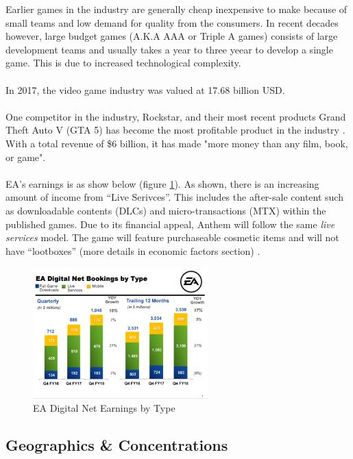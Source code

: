 \documentclass[10pt,letterpaper]{article}
\begin{document}
Earlier games in the industry are generally cheap inexpensive to make because of small teams and low demand for quality from the consumers. In recent decades however, large budget games (A.K.A AAA or Triple A games) consists of large development teams and usually takes  a year to three yeear to develop a single game. This is due to increased technological complexity.\cite{cost-game}\\
\\
In 2017, the video game industry was valued at 17.68 billion USD\cite{video-game-industry-stats}.\\
\\
One competitor in the industry, Rockstar, and their most recent products Grand Theft Auto V (GTA 5) has become the most profitable product in the industry \cite{ign-gta5}. With a total revenue of \$6 billion, it has made "more money than any film, book, or game".\\
\\
EA's earnings is as show below (figure \ref{fig:ea-revenue}). As shown, there is an increasing amount of income from ``Live Serivces''. This includes the after-sale content such as downloadable contents (DLCs) and micro-transactions (MTX) within the published games. Due to its financial appeal, Anthem will follow the same \textit{live services} model. The game will feature purchaseable cosmetic items  and will not have ``lootboxes'' (more details in economic factors section) \cite{ea-earnings}.\\

\begin{figure}[H]
	\centering
	\includegraphics[width=0.6\textwidth]{assets/ea-revenue}
	\caption{EA Digital Net Earnings by Type\cite{ea-earnings}}
	\label{fig:ea-revenue}
\end{figure}

\subsection{Geographics \& Concentrations}
\end{document}
